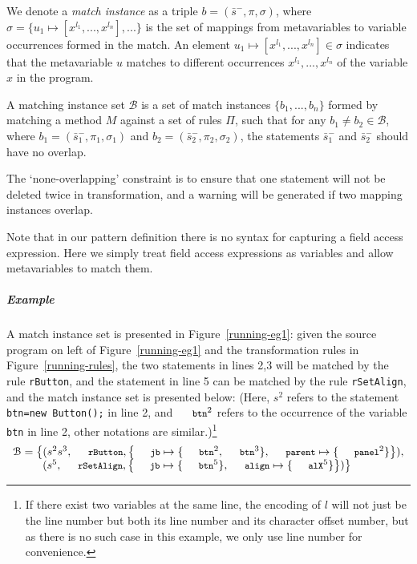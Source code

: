 \documentclass[letterpaper, USenglish]{lipics-v2016}
\newcommand{\code}[1]{\texttt{\footnotesize #1}}
\theoremstyle{plain}
\begin{document}
We denote a \emph{match instance} as a triple $b=(\bar{s}^-,\pi,\sigma)$, where $\sigma=\{u_1\mapsto[x^{l_1},...,x^{l_n}],...\}$ is the set of mappings from metavariables to variable occurrences formed in the match. An element $u_1\mapsto[x^{l_1},...,x^{l_n}]\in\sigma$ indicates that the metavariable $u$ matches to different occurrences $x^{l_1},...,x^{l_n}$ of the variable $x$ in the program.

\begin{definition}
A matching instance set $\mathcal{B}$ is a set of match instances
$\{b_1,...,b_n\}$ formed by matching a method $M$ against a set of rules $\Pi$,
such that for any $b_1\neq b_2\in
\mathcal{B}$, where $b_1=(\bar{s}_1^-,\pi_1,\sigma_1)$ and
$b_2=(\bar{s}_2^-,\pi_2,\sigma_2)$, the statements $\bar{s}_1^-$ and
$\bar{s}_2^-$ should have no overlap.
\end{definition}
The `none-overlapping' constraint is to ensure
that one statement will not be deleted twice in transformation, 
and a warning will be generated if two mapping instances overlap.

Note that in our pattern definition there is no syntax for capturing
a field access expression. Here we simply treat field access expressions as variables
and allow metavariables to match them.

\subparagraph*{Example} A match instance set is presented in Figure~\ref{running-eg1}: given the source program on left of Figure~\ref{running-eg1} and the transformation rules in Figure~\ref{running-rules}, the two statements in lines 2,3 will be matched by the rule \code{rButton}, and the statement in line 5 can be matched by the rule \code{rSetAlign}, and the match instance set is presented below: (Here, $s^2$ refers to the statement \code{btn=new Button();} in line 2, and $\code{btn}^2$ refers to the occurrence of the variable \code{btn} in line 2, other notations are similar.)\footnote{If there exist two variables at the same line, the encoding of $l$ will not just be the line number but both its line number and its character offset number, but as there is no such case in this example, we only use line number for convenience.}
\begin{equation}
\label{eqn:basic-matchinstance}
\begin{array}{l}
 	\mathcal{B}=\big\{(s^2s^3, \code{rButton}, \left\{\code{jb}\mapsto\{\code{btn}^2, \code{btn}^3\}, \code{parent}\mapsto\{\code{panel}^2\}\right\}),\\
 	\quad\quad~~(s^5, \code{rSetAlign}, \left\{\code{jb}\mapsto\{\code{btn}^5\}, \code{align}\mapsto\{\code{alX}^5\}\right\})\big\}
\end{array}
\end{equation}
\end{document}
